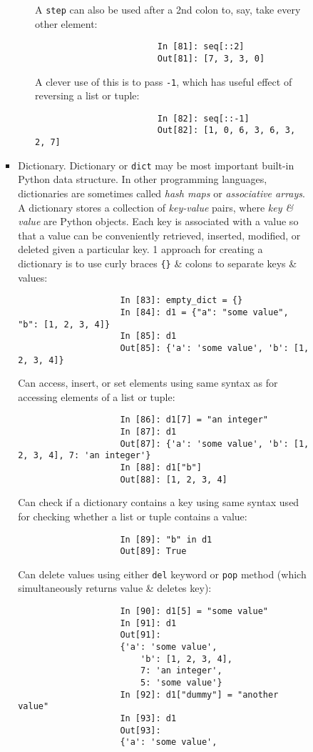 \documentclass{article}
\begin{document}
\begin{enumerate}
\begin{itemize}
\begin{itemize}
\begin{itemize}
\begin{itemize}
					A {\tt step} can also be used after a 2nd colon to, say, take every other element:
					\begin{verbatim}
						In [81]: seq[::2]
						Out[81]: [7, 3, 3, 0]
					\end{verbatim}
					A clever use of this is to pass {\tt-1}, which has useful effect of reversing a list or tuple:
					\begin{verbatim}
						In [82]: seq[::-1]
						Out[82]: [1, 0, 6, 3, 6, 3, 2, 7]
					\end{verbatim}
				\end{itemize}
				\item {\sf Dictionary.} Dictionary or {\tt dict} may be most important built-in Python data structure. In other programming languages, dictionaries are sometimes called {\it hash maps} or {\it associative arrays}. A dictionary stores a collection of {\it key-value} pairs, where {\it key \& value} are Python objects. Each key is associated with a value so that a value can be conveniently retrieved, inserted, modified, or deleted given a particular key. 1 approach for creating a dictionary is to use curly braces \verb|{}| \& colons to separate keys \& values:
				\begin{verbatim}
					In [83]: empty_dict = {}
					In [84]: d1 = {"a": "some value", "b": [1, 2, 3, 4]}
					In [85]: d1
					Out[85]: {'a': 'some value', 'b': [1, 2, 3, 4]}
				\end{verbatim}
				Can access, insert, or set elements using same syntax as for accessing elements of a list or tuple:
				\begin{verbatim}
					In [86]: d1[7] = "an integer"
					In [87]: d1
					Out[87]: {'a': 'some value', 'b': [1, 2, 3, 4], 7: 'an integer'}
					In [88]: d1["b"]
					Out[88]: [1, 2, 3, 4]
				\end{verbatim}
				Can check if a dictionary contains a key using same syntax used for checking whether a list or tuple contains a value:
				\begin{verbatim}
					In [89]: "b" in d1
					Out[89]: True
				\end{verbatim}
				Can delete values using either {\tt del} keyword or {\tt pop} method (which simultaneously returns value \& deletes key):
				\begin{verbatim}
					In [90]: d1[5] = "some value"
					In [91]: d1
					Out[91]:
					{'a': 'some value',
						'b': [1, 2, 3, 4],
						7: 'an integer',
						5: 'some value'}
					In [92]: d1["dummy"] = "another value"
					In [93]: d1
					Out[93]:
					{'a': 'some value',

\end{verbatim}
\end{itemize}
\end{itemize}
\end{itemize}
\end{enumerate}
\end{document}

